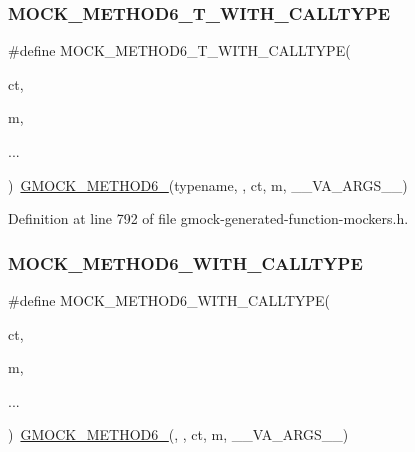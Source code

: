\subsubsection{\texorpdfstring{M\+O\+C\+K\+\_\+\+M\+E\+T\+H\+O\+D6\+\_\+\+T\+\_\+\+W\+I\+T\+H\+\_\+\+C\+A\+L\+L\+T\+Y\+PE}{MOCK\_METHOD6\_T\_WITH\_CALLTYPE}}
{\footnotesize\ttfamily \#define M\+O\+C\+K\+\_\+\+M\+E\+T\+H\+O\+D6\+\_\+\+T\+\_\+\+W\+I\+T\+H\+\_\+\+C\+A\+L\+L\+T\+Y\+PE(\begin{DoxyParamCaption}\item[{}]{ct,  }\item[{}]{m,  }\item[{}]{... }\end{DoxyParamCaption})~\hyperlink{gmock-generated-function-mockers_8h_ad0ca7f6973a076d0af4c953f8ed91842}{G\+M\+O\+C\+K\+\_\+\+M\+E\+T\+H\+O\+D6\+\_\+}(typename, , ct, m, \+\_\+\+\_\+\+V\+A\+\_\+\+A\+R\+G\+S\+\_\+\+\_\+)}



Definition at line 792 of file gmock-\/generated-\/function-\/mockers.\+h.

\mbox{\label{gmock-generated-function-mockers_8h_a1e55bb6ae5cfcb0403c867541f5f0931}} 
\subsubsection{\texorpdfstring{M\+O\+C\+K\+\_\+\+M\+E\+T\+H\+O\+D6\+\_\+\+W\+I\+T\+H\+\_\+\+C\+A\+L\+L\+T\+Y\+PE}{MOCK\_METHOD6\_WITH\_CALLTYPE}}
{\footnotesize\ttfamily \#define M\+O\+C\+K\+\_\+\+M\+E\+T\+H\+O\+D6\+\_\+\+W\+I\+T\+H\+\_\+\+C\+A\+L\+L\+T\+Y\+PE(\begin{DoxyParamCaption}\item[{}]{ct,  }\item[{}]{m,  }\item[{}]{... }\end{DoxyParamCaption})~\hyperlink{gmock-generated-function-mockers_8h_ad0ca7f6973a076d0af4c953f8ed91842}{G\+M\+O\+C\+K\+\_\+\+M\+E\+T\+H\+O\+D6\+\_\+}(, , ct, m, \+\_\+\+\_\+\+V\+A\+\_\+\+A\+R\+G\+S\+\_\+\+\_\+)}



